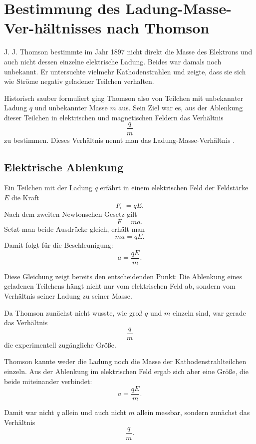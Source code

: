 \section{Bestimmung des Ladung-Masse-Ver-\newline hältnisses nach Thomson}
\label{app:thomson-qm-herleitung}

J. J. Thomson bestimmte im Jahr 1897 nicht direkt die
Masse des Elektrons und auch nicht dessen einzelne elektrische Ladung. Beides war
damals noch unbekannt. Er untersuchte vielmehr Kathodenstrahlen
und zeigte, dass sie sich wie Ströme negativ geladener Teilchen verhalten.

Historisch sauber formuliert ging Thomson also von Teilchen mit unbekannter Ladung
\(q\) und unbekannter Masse \(m\) aus. Sein Ziel war es, aus der Ablenkung dieser
Teilchen in elektrischen und magnetischen Feldern das Verhältnis
\[
\frac{q}{m}
\]
zu bestimmen. Dieses Verhältnis nennt man das Ladung-Masse-Verhältnis
.

\subsection*{Elektrische Ablenkung}

Ein Teilchen mit der Ladung \(q\) erfährt in einem elektrischen Feld
 der Feldstärke \(E\) die Kraft
\[
F_\mathrm{el} = qE.
\]
Nach dem zweiten Newtonschen Gesetz gilt
\[
F = ma.
\]
Setzt man beide Ausdrücke gleich, erhält man
\[
ma = qE.
\]
Damit folgt für die Beschleunigung:
\[
a = \frac{qE}{m}.
\]

Diese Gleichung zeigt bereits den entscheidenden Punkt: Die Ablenkung eines geladenen
Teilchens hängt nicht nur vom elektrischen Feld ab, sondern vom Verhältnis seiner
Ladung zu seiner Masse.

Da Thomson zunächst nicht wusste, wie groß \(q\) und \(m\) einzeln sind, war gerade
das Verhältnis
\[
\frac{q}{m}
\]
die experimentell zugängliche Größe.

\begin{MathBox}
	\label{box:thomson-qm-statt-einzelwerte}
	Thomson kannte weder die Ladung noch die Masse der Kathodenstrahlteilchen einzeln.
	Aus der Ablenkung im elektrischen Feld ergab sich aber eine Größe, die beide
	miteinander verbindet:
	\[
	a = \frac{qE}{m}.
	\]
	
	Damit war nicht \(q\) allein und auch nicht \(m\) allein messbar, sondern zunächst
	das Verhältnis
	\[
	\frac{q}{m}.
	\]
\end{MathBox}

